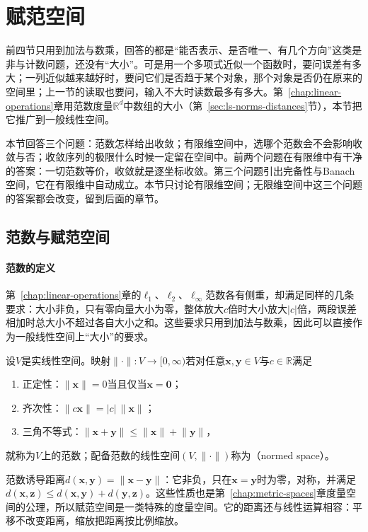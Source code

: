 
\section{赋范空间}
\label{sec:ls-normed-spaces}

前四节只用到加法与数乘，回答的都是“能否表示、是否唯一、有几个方向”这类是非与计数问题，还没有“大小”。可是用一个多项式近似一个函数时，要问误差有多大；一列近似越来越好时，要问它们是否趋于某个对象，那个对象是否仍在原来的空间里；上一节的读取也要问，输入不大时读数最多有多大。第~\ref{chap:linear-operations}章用范数度量$\mathbb R^d$中数组的大小（第~\ref{sec:ls-norms-distances}节），本节把它推广到一般线性空间。

本节回答三个问题：范数怎样给出收敛；有限维空间中，选哪个范数会不会影响收敛与否；收敛序列的极限什么时候一定留在空间中。前两个问题在有限维中有干净的答案：一切范数等价，收敛就是逐坐标收敛。第三个问题引出完备性与Banach空间，它在有限维中自动成立。本节只讨论有限维空间；无限维空间中这三个问题的答案都会改变，留到后面的章节。

\subsection{范数与赋范空间}
\label{sec:ls-normed-space-definition}

\paragraph{范数的定义}
第~\ref{chap:linear-operations}章的$\ell_1$、$\ell_2$、$\ell_\infty$范数各有侧重，却满足同样的几条要求：大小非负，只有零向量大小为零，整体放大$c$倍时大小放大$|c|$倍，两段误差相加时总大小不超过各自大小之和。这些要求只用到加法与数乘，因此可以直接作为一般线性空间上“大小”的要求。
\begin{definition}[赋范空间]
\label{def:ls-normed-space}
设$V$是实线性空间。映射$\lVert\cdot\rVert:V\to[0,\infty)$若对任意$\bm x,\bm y\in V$与$c\in\mathbb R$满足
\begin{enumerate}
 \item 正定性：$\lVert\bm x\rVert=0$当且仅当$\bm x=\bm0$；
 \item 齐次性：$\lVert c\bm x\rVert=|c|\,\lVert\bm x\rVert$；
 \item 三角不等式：$\lVert\bm x+\bm y\rVert\leq\lVert\bm x\rVert+\lVert\bm y\rVert$，
\end{enumerate}
就称为$V$上的范数；配备范数的线性空间$(V,\lVert\cdot\rVert)$称为（normed space）。
\end{definition}
范数诱导距离$d(\bm x,\bm y)=\lVert\bm x-\bm y\rVert$：它非负，只在$\bm x=\bm y$时为零，对称，并满足$d(\bm x,\bm z)\leq d(\bm x,\bm y)+d(\bm y,\bm z)$。这些性质也是第~\ref{chap:metric-spaces}章度量空间的公理，所以赋范空间是一类特殊的度量空间。它的距离还与线性运算相容：平移不改变距离，缩放把距离按比例缩放。

